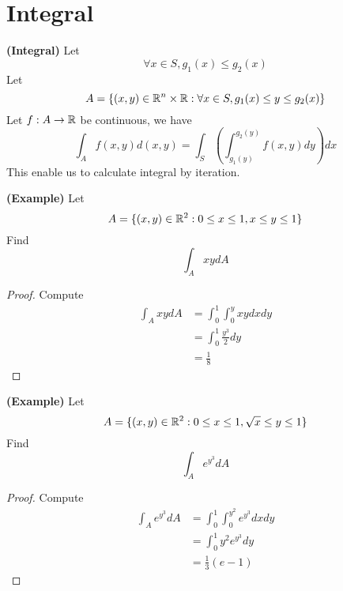 \documentclass{report}
\begin{document}
\section{Integral}
\begin{theorem}
\label{4.6.1}
\textbf{(Integral)} Let 
 \begin{equation}
\forall x \in S, g_1(x)\leq g_2(x)
\end{equation}
Let  
\begin{equation}
A=\{ (x,y)\in \mathbb{R}^n \times \mathbb{R}: \forall x \in S, g_1(x)\leq y\leq g_2(x) \}
\end{equation}
Let $f:A \rightarrow \mathbb{R}$ be continuous, we have
\begin{equation}
\int_A f(x,y)d(x,y)=\int_S(\int_{g_1(y)}^{g_2(y)} f(x,y)dy)dx
\end{equation}
This enable us to calculate integral by iteration.  
\end{theorem}
\begin{theorem}
\label{4.6.2}
\textbf{(Example)} Let 
\begin{equation}
A=\{ (x,y)\in\mathbb{R}^2 : 0\leq x\leq 1, x\leq y\leq 1 \}
\end{equation}
Find
\begin{equation}
\int_A xydA
\end{equation}
\end{theorem}
\begin{proof}
Compute
\begin{align}
  \int_A xydA&=\int_0^1\int_0^y xy dxdy\\
  &=\int_0^1 \frac{y^3}{2}dy\\
  &=\frac{1}{8}
\end{align}
\end{proof}
\begin{theorem}
\label{4.6.3}
\textbf{(Example)} Let 
\begin{equation}
A=\{ (x,y)\in\mathbb{R}^2 :0\leq x\leq 1, \sqrt{x} \leq y\leq 1 \}
\end{equation}
Find 
\begin{equation}
\int_A e^{y^3}dA
\end{equation}
\end{theorem}
\begin{proof}
Compute
\begin{align}
  \int_A e^{y^3}dA&=\int^1_0\int^{y^2}_0 e^{y^3}dxdy\\
&=\int_0^1 y^2e^{y^3}dy\\
&=\frac{1}{3}(e-1)
\end{align}
\end{proof}
\end{document}
